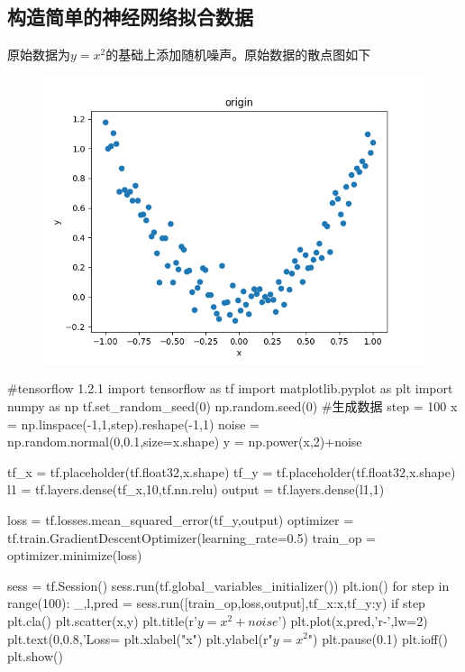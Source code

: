 \subsection{构造简单的神经网络拟合数据}
原始数据为$y=x^2$的基础上添加随机噪声。原始数据的散点图如下
\begin{center}
\begin{figure}[H]
\includegraphics[scale=0.6]{./pic/chapter1/origin.png}
\end{figure}
\end{center}
\begin{python}
#tensorflow 1.2.1
import tensorflow as tf
import matplotlib.pyplot as plt
import numpy as np
tf.set_random_seed(0)
np.random.seed(0)
#生成数据
step = 100
x = np.linspace(-1,1,step).reshape(-1,1)
noise = np.random.normal(0,0.1,size=x.shape)
y = np.power(x,2)+noise

tf_x = tf.placeholder(tf.float32,x.shape)
tf_y = tf.placeholder(tf.float32,x.shape)
l1 =  tf.layers.dense(tf_x,10,tf.nn.relu)
output = tf.layers.dense(l1,1)

loss = tf.losses.mean_squared_error(tf_y,output)
optimizer = tf.train.GradientDescentOptimizer(learning_rate=0.5)
train_op = optimizer.minimize(loss)

sess = tf.Session()
sess.run(tf.global_variables_initializer())
plt.ion()
for step in range(100):
    _,l,pred = sess.run([train_op,loss,output],{tf_x:x,tf_y:y})
    if step%
        plt.cla()
        plt.scatter(x,y)
        plt.title(r'$y=x^2+noise$')
        plt.plot(x,pred,'r-',lw=2)
        plt.text(0,0.8,'Loss=%
        plt.xlabel("x")
        plt.ylabel(r"$y=x^2$")
        plt.pause(0.1)
plt.ioff()
plt.show()
\end{python}
